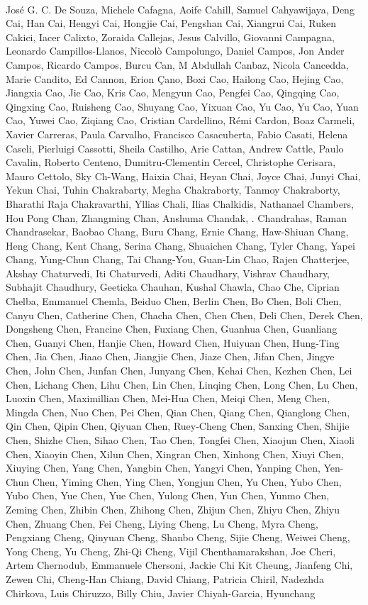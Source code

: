 \paragraph{}José G. C. De Souza, Michele Cafagna, Aoife Cahill, Samuel Cahyawijaya, Deng Cai, Han Cai, Hengyi Cai, Hongjie Cai, Pengshan Cai, Xiangrui Cai, Ruken Cakici, Iacer Calixto, Zoraida Callejas, Jesus Calvillo, Giovanni Campagna, Leonardo Campillos-Llanos, Niccolò Campolungo, Daniel Campos, Jon Ander Campos, Ricardo Campos, Burcu Can, M Abdullah Canbaz, Nicola Cancedda, Marie Candito, Ed Cannon, Erion Çano, Boxi Cao, Hailong Cao, Hejing Cao, Jiangxia Cao, Jie Cao, Kris Cao, Mengyun Cao, Pengfei Cao, Qingqing Cao, Qingxing Cao, Ruisheng Cao, Shuyang Cao, Yixuan Cao, Yu Cao, Yu Cao, Yuan Cao, Yuwei Cao, Ziqiang Cao, Cristian Cardellino, Rémi Cardon, Boaz Carmeli, Xavier Carreras, Paula Carvalho, Francisco Casacuberta, Fabio Casati, Helena Caseli, Pierluigi Cassotti, Sheila Castilho, Arie Cattan, Andrew Cattle, Paulo Cavalin, Roberto Centeno, Dumitru-Clementin Cercel, Christophe Cerisara, Mauro Cettolo, Sky Ch-Wang, Haixia Chai, Heyan Chai, Joyce Chai, Junyi Chai, Yekun Chai, Tuhin Chakrabarty, Megha Chakraborty, Tanmoy Chakraborty, Bharathi Raja Chakravarthi, Yllias Chali, Ilias Chalkidis, Nathanael Chambers, Hou Pong Chan, Zhangming Chan, Anshuma Chandak, . Chandrahas, Raman Chandrasekar, Baobao Chang, Buru Chang, Ernie Chang, Haw-Shiuan Chang, Heng Chang, Kent Chang, Serina Chang, Shuaichen Chang, Tyler Chang, Yapei Chang, Yung-Chun Chang, Tai Chang-You, Guan-Lin Chao, Rajen Chatterjee, Akshay Chaturvedi, Iti Chaturvedi, Aditi Chaudhary, Vishrav Chaudhary, Subhajit Chaudhury, Geeticka Chauhan, Kushal Chawla, Chao Che, Ciprian Chelba, Emmanuel Chemla, Beiduo Chen, Berlin Chen, Bo Chen, Boli Chen, Canyu Chen, Catherine Chen, Chacha Chen, Chen Chen, Deli Chen, Derek Chen, Dongsheng Chen, Francine Chen, Fuxiang Chen, Guanhua Chen, Guanliang Chen, Guanyi Chen, Hanjie Chen, Howard Chen, Huiyuan Chen, Hung-Ting Chen, Jia Chen, Jiaao Chen, Jiangjie Chen, Jiaze Chen, Jifan Chen, Jingye Chen, John Chen, Junfan Chen, Junyang Chen, Kehai Chen, Kezhen Chen, Lei Chen, Lichang Chen, Lihu Chen, Lin Chen, Linqing Chen, Long Chen, Lu Chen, Luoxin Chen, Maximillian Chen, Mei-Hua Chen, Meiqi Chen, Meng Chen, Mingda Chen, Nuo Chen, Pei Chen, Qian Chen, Qiang Chen, Qianglong Chen, Qin Chen, Qipin Chen, Qiyuan Chen, Ruey-Cheng Chen, Sanxing Chen, Shijie Chen, Shizhe Chen, Sihao Chen, Tao Chen, Tongfei Chen, Xiaojun Chen, Xiaoli Chen, Xiaoyin Chen, Xilun Chen, Xingran Chen, Xinhong Chen, Xiuyi Chen, Xiuying Chen, Yang Chen, Yangbin Chen, Yangyi Chen, Yanping Chen, Yen-Chun Chen, Yiming Chen, Ying Chen, Yongjun Chen, Yu Chen, Yubo Chen, Yubo Chen, Yue Chen, Yue Chen, Yulong Chen, Yun Chen, Yunmo Chen, Zeming Chen, Zhibin Chen, Zhihong Chen, Zhijun Chen, Zhiyu Chen, Zhiyu Chen, Zhuang Chen, Fei Cheng, Liying Cheng, Lu Cheng, Myra Cheng, Pengxiang Cheng, Qinyuan Cheng, Shanbo Cheng, Sijie Cheng, Weiwei Cheng, Yong Cheng, Yu Cheng, Zhi-Qi Cheng, Vijil Chenthamarakshan, Joe Cheri, Artem Chernodub, Emmanuele Chersoni, Jackie Chi Kit Cheung, Jianfeng Chi, Zewen Chi, Cheng-Han Chiang, David Chiang, Patricia Chiril, Nadezhda Chirkova, Luis Chiruzzo, Billy Chiu, Javier Chiyah-Garcia, Hyunchang 